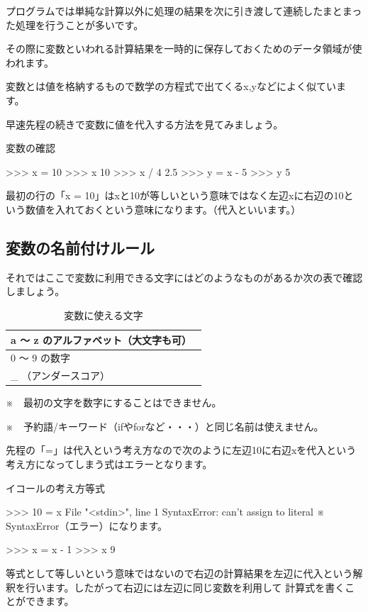 \documentclass[11pt,a4paper,dvipdfmx,titlepage]{jsreport}
\begin{document}
プログラムでは単純な計算以外に処理の結果を次に引き渡して連続したまとまった処理を行うことが多いです。

その際に変数といわれる計算結果を一時的に保存しておくためのデータ領域が使われます。

 変数とは値を格納するもので数学の方程式で出てくるx,yなどによく似ています。

早速先程の続きで変数に値を代入する方法を見てみましょう。

\begin{grabox}{変数の確認}
\begin{listingcont}
>>> x = 10
>>> x
10
>>> x / 4
2.5
>>> y = x - 5
>>> y
5
\end{listingcont}
\end{grabox}
最初の行の「x = 10」はxと10が等しいという意味ではなく左辺xに右辺の10という数値を入れておくという意味になります。（代入といいます。）

\subsection{変数の名前付けルール}
それではここで変数に利用できる文字にはどのようなものがあるか次の表で確認しましょう。
\begin{table}[h]
 \begin{center}
    \caption{変数に使える文字}
\begin{tabular}{|p{10cm}|} \hline
a ～ z のアルファベット（大文字も可）　\\ \hline
0 〜 9 の数字 \\ \hline
\_ （アンダースコア） \\ \hline
\end{tabular}
\end{center}
\end{table}


\begin{description}

\item ※　最初の文字を数字にすることはできません。
\item ※　予約語/キーワード（ifやforなど・・・）と同じ名前は使えません。

\end{description}
 先程の「=」は代入という考え方なので次のように左辺10に右辺xを代入という考え方になってしまう式はエラーとなります。


\begin{grabox}{イコールの考え方等式}
\begin{listingcont}
>>> 10 = x
  File "<stdin>", line 1
SyntaxError: can't assign to literal
 ※ SyntaxError（エラー）になります。

>>> x = x - 1
>>> x
9
\end{listingcont}
\end{grabox}
等式として等しいという意味ではないので右辺の計算結果を左辺に代入という解釈を行います。したがって右辺には左辺に同じ変数を利用して
計算式を書くことができます。
\end{document}
